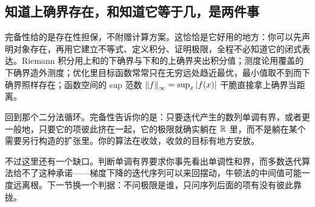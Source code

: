 \subsection{知道上确界存在，和知道它等于几，是两件事}

完备性给的是存在性担保，不附赠计算方案。这恰恰是它好用的地方：你可以先声明对象存在，再用它建立不等式、定义积分、证明极限，全程不必知道它的闭式表达。Riemann 积分用上和的下确界与下和的上确界夹出积分值；测度论用覆盖的下确界造外测度；优化里目标函数常常只在无穷远处趋近最优，最小值取不到而下确界照样存在；函数空间的 sup 范数 \(\left\lVert f\right\rVert_\infty=\sup_x\left|f(x)\right|\) 干脆直接拿上确界当距离。

回到那个二分法循环。完备性告诉你的是：只要迭代产生的数列单调有界，或者更一般地，只要它的项彼此挤在一起，它的极限就确实躺在 \(\mathbb{R}\) 里，而不是躺在某个需要另行构造的扩张里。你的算法在收敛，收敛的目标有地方安放。

不过这里还有一个缺口。判断单调有界要求你事先看出单调性和界，而多数迭代算法给不了这种承诺——梯度下降的迭代序列可以来回摆动，牛顿法的中间值可能一度远离根。下一节换一个判据：不问极限是谁，只问序列后面的项有没有彼此靠拢。
